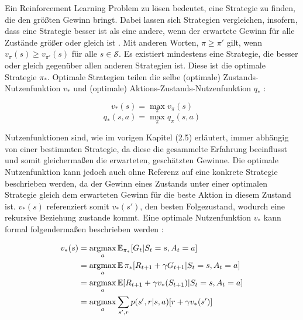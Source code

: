 Ein Reinforcement Learning Problem zu lösen bedeutet, eine Strategie zu finden, die den größten Gewinn bringt. Dabei lassen sich Strategien vergleichen, insofern, dass eine Strategie besser ist als eine andere, wenn der erwartete Gewinn für alle Zustände größer oder gleich ist \cite[S.~62f]{Sutton1998}. Mit anderen Worten, $\pi \geq \pi'$ gilt, wenn $v_\pi(s) \geq v_{\pi'}(s)$ für alle $s \in \mathcal{S}$. Es existiert mindestens eine Strategie, die besser oder gleich gegenüber allen anderen Strategien ist. Diese ist die optimale Strategie $\pi_*$. Optimale Strategien teilen die selbe (optimale) Zustands-Nutzenfunktion $v_*$ und (optimale) Aktions-Zustands-Nutzenfunktion $q_*$ \cite[S.~62f]{Sutton1998}:

\begin{equation}\label{eq:optimaleValueFunction}
    v_*(s) = \max_\pi v_\pi(s)
\end{equation}
\begin{equation}\label{eq:optimaleActionValueFunction}
    q_*(s,a) = \max_\pi q_\pi(s,a)
\end{equation}

Nutzenfunktionen sind, wie im vorigen Kapitel (2.5) erläutert, immer abhängig von einer bestimmten Strategie, da diese die gesammelte Erfahrung beeinflusst und somit gleichermaßen die erwarteten, geschätzten Gewinne. Die optimale Nutzenfunktion kann jedoch auch ohne Referenz auf eine konkrete Strategie beschrieben werden, da der Gewinn eines Zustands unter einer optimalen Strategie gleich dem erwarteten Gewinn für die beste Aktion in diesem Zustand ist. $v_*(s)$ referenziert somit $v_*(s')$, den besten Folgezustand, wodurch eine rekursive Beziehung zustande kommt. Eine optimale Nutzenfunktion $v_*$ kann formal folgendermaßen beschrieben werden \cite[S.~63]{Sutton1998}:

\begin{equation}\label{eq:bellmanValue}
    \begin{aligned}
        v_*(s) &= \operatorname*{argmax}_a \operatorname{\mathbb{E}}_{\pi_*}[G_t | S_t = s, A_t = a] \\
        &= \operatorname*{argmax}_a \operatorname{\mathbb{E}}{\pi_*}[ R_{t+1} + \gamma G_{t+1} | S_t = s, A_t = a] \\
        &= \operatorname*{argmax}_a \operatorname{\mathbb{E}}[ R_{t+1} + \gamma v_*(S_{t+1}) | S_t = s, A_t = a] \\
        &= \operatorname*{argmax}_a \sum_{s',r}p(s', r | s,a)[r+ \gamma v_*(s')]
    \end{aligned}
\end{equation}

